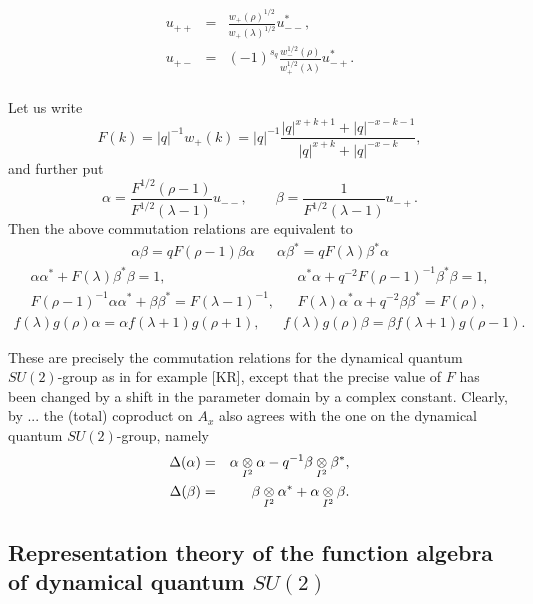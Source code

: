 

\begin{eqnarray*} u_{++} &=& \frac{w_+(\rho)^{1/2}}{w_+(\lambda)^{1/2}}u_{--}^*,\\u_{+-}&=& (-1)^{s_q}  \frac{w_-^{1/2}(\rho)}{w_+^{1/2}(\lambda)}u_{-+}^*.  \\ 
\end{eqnarray*}

Let us write \[F(k) = |q|^{-1}w_+(k) =  |q|^{-1}\frac{|q|^{x+k+1}+|q|^{-x-k-1}}{|q|^{x+k}+|q|^{-x-k}},\] and further put\[\alpha = \frac{F^{1/2}(\rho-1)}{F^{1/2}(\lambda-1)}u_{--},\qquad \beta = \frac{1}{F^{1/2}(\lambda-1)}u_{-+}.\] Then the above commutation relations are equivalent to \begin{align*} \alpha \beta = qF(\rho-1)\beta\alpha && \alpha\beta^* = qF(\lambda)\beta^*\alpha\end{align*} \begin{align*} \alpha\alpha^* +F(\lambda)\beta^*\beta = 1,&& \alpha^*\alpha+q^{-2}F(\rho-1)^{-1}\beta^*\beta = 1,\\ F(\rho-1)^{-1}\alpha\alpha^* +\beta\beta^* = F(\lambda-1)^{-1},&& F(\lambda)\alpha^*\alpha +q^{-2}\beta\beta^* = F(\rho),\end{align*} \begin{align*} f(\lambda)g(\rho)\alpha =
\alpha f(\lambda+1)g(\rho+1),&& f(\lambda)g(\rho)\beta = \beta f(\lambda+1)g(\rho-1).\end{align*}

These are precisely the commutation relations for the dynamical quantum $SU(2)$-group as in for example [KR], except that the precise value of $F$ has been changed by a shift in the parameter domain by a complex constant. Clearly, by ... the (total) coproduct on $A_x$ also  agrees with the one on the dynamical quantum $SU(2)$-group, namely \begin{eqnarray*} \Delta(\alpha) &=& \alpha\underset{I^2}{\otimes} \alpha - q^{-1}\beta\underset{I^2}{\otimes} \beta^*,\\ \Delta(\beta) &=& \beta\underset{I^2}{\otimes} \alpha^* +\alpha\underset{I^2}{\otimes} \beta.\end{eqnarray*}%

\subsection{Representation theory of the function algebra of dynamical quantum $SU(2)$}

